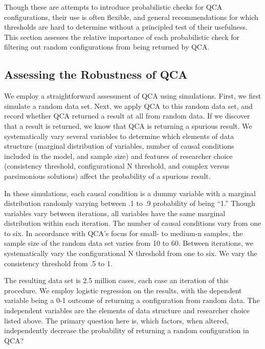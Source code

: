 \documentclass[]{article}
\begin{document}
{Though these are attempts to introduce probabilistic checks for QCA configurations, their use is often flexible, and general recommendations for which thresholds are hard to determine without a principled test of their usefulness. This section assesses the relative importance of each probabilistic check for filtering out random configurations from being returned by QCA. 

\subsection{Assessing the Robustness of QCA}

We employ a straightforward assessment of QCA using simulations. First, we first simulate a random data set. Next, we apply QCA to this random data set, and record whether QCA returned a result at all from random data. If we discover that a result is returned, we know that QCA is returning a spurious result. We systematically vary several variables to determine which elements of data structure (marginal distribution of variables, number of causal conditions included in the model, and sample size) and features of researcher choice (consistency threshold, configurational N threshold, and complex versus parsimonious solutions) affect the probability of a spurious result.  %

In these simulations, each causal condition is a dummy variable with a marginal distribution randomly varying between .1 to .9 probability of being ``1.'' Though variables vary between iterations, all variables have the same marginal distribution within each iteration. The number of causal conditions vary from one to six. In accordance with QCA's focus for small- to medium-n samples, the sample size of the random data set varies from 10 to 60. Between iterations, we systematically vary the configurational N threshold from one to six. We vary the consistency threshold from .5 to 1.

The resulting data set is 2.5 million cases, each case an iteration of this procedure. We employ logistic regression on the results, with the dependent variable being a 0-1 outcome of returning a configuration from random data. The independent variables are the elements of data structure and researcher choice listed above. The primary question here is, which factors, when altered, independently decrease the probability of returning a random configuration in QCA?

}
\end{document}
